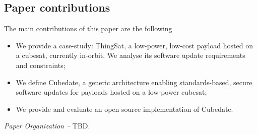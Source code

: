 \subsection*{Paper contributions}
The main contributions of this paper are the following
\begin{itemize}
    \item We provide a case-study: ThingSat, a low-power, low-cost payload hosted on a cubesat, currently in-orbit. We analyse its software update requirements and constraints;
    \item We define Cubedate, a generic architecture enabling standards-based, secure software updates for payloads hosted on a low-power cubesat;
    \item We provide and evaluate an open source implementation of Cubedate.
\end{itemize}


\iffalse

\textit{Paper Organization --}
TBD.


